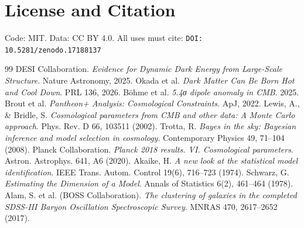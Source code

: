\documentclass[11pt,a4paper]{article}
\begin{document}
\section*{License and Citation}
Code: MIT. Data: CC BY 4.0.
All uses must cite: \texttt{DOI: 10.5281/zenodo.17188137}

\begin{thebibliography}{99}
 DESI Collaboration. \textit{Evidence for Dynamic Dark Energy from Large-Scale Structure}. Nature Astronomy, 2025.
 Okada et al. \textit{Dark Matter Can Be Born Hot and Cool Down}. PRL 136, 2026.
 Böhme et al. \textit{5.4σ dipole anomaly in CMB}. 2025.
 Brout et al. \textit{Pantheon+ Analysis: Cosmological Constraints}. ApJ, 2022.
 Lewis, A., \& Bridle, S. \textit{Cosmological parameters from CMB and other data: A Monte Carlo approach}. Phys. Rev. D 66, 103511 (2002).
 Trotta, R. \textit{Bayes in the sky: Bayesian inference and model selection in cosmology}. Contemporary Physics 49, 71--104 (2008).
 Planck Collaboration. \textit{Planck 2018 results. VI. Cosmological parameters}. Astron. Astrophys. 641, A6 (2020).
 Akaike, H. \textit{A new look at the statistical model identification}. IEEE Trans. Autom. Control 19(6), 716--723 (1974).
 Schwarz, G. \textit{Estimating the Dimension of a Model}. Annals of Statistics 6(2), 461--464 (1978).
 Alam, S. et al. (BOSS Collaboration). \textit{The clustering of galaxies in the completed SDSS-III Baryon Oscillation Spectroscopic Survey}. MNRAS 470, 2617--2652 (2017).
\end{thebibliography}
\end{document}
